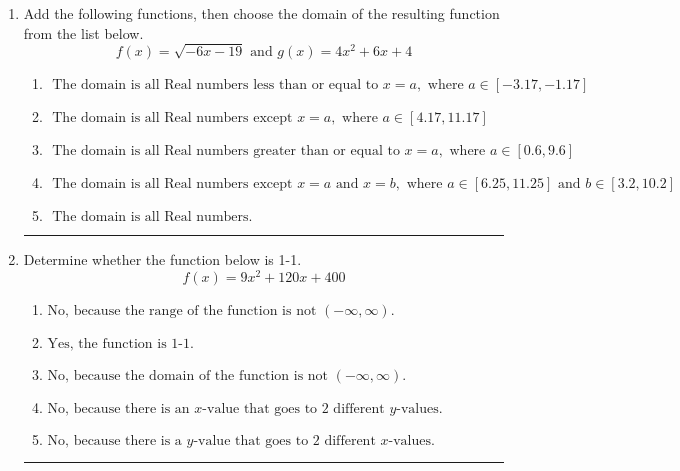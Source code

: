 \documentclass[14pt]{extbook}
\newcommand{\litem}[1]{\item#1\hspace*{-1cm}\rule{\textwidth}{0.4pt}}
\begin{document}
\begin{enumerate}
{\begin{enumerate}[label=\Alph*.]
\end{enumerate} }
\litem{
Add the following functions, then choose the domain of the resulting function from the list below.\[ f(x) = \sqrt{-6x-19}  \text{ and } g(x) = 4x^{2} +6 x + 4 \]\begin{enumerate}[label=\Alph*.]
\item \( \text{ The domain is all Real numbers less than or equal to } x = a, \text{ where } a \in [-3.17, -1.17] \)
\item \( \text{ The domain is all Real numbers except } x = a, \text{ where } a \in [4.17, 11.17] \)
\item \( \text{ The domain is all Real numbers greater than or equal to } x = a, \text{ where } a \in [0.6, 9.6] \)
\item \( \text{ The domain is all Real numbers except } x = a \text{ and } x = b, \text{ where } a \in [6.25, 11.25] \text{ and } b \in [3.2, 10.2] \)
\item \( \text{ The domain is all Real numbers. } \)

\end{enumerate} }
\litem{
Determine whether the function below is 1-1.\[ f(x) = 9 x^2 + 120 x + 400 \]\begin{enumerate}[label=\Alph*.]
\item \( \text{No, because the range of the function is not $(-\infty, \infty)$.} \)
\item \( \text{Yes, the function is 1-1.} \)
\item \( \text{No, because the domain of the function is not $(-\infty, \infty)$.} \)
\item \( \text{No, because there is an $x$-value that goes to 2 different $y$-values.} \)
\item \( \text{No, because there is a $y$-value that goes to 2 different $x$-values.} \)

\end{enumerate} }
\end{enumerate}
\end{document}
